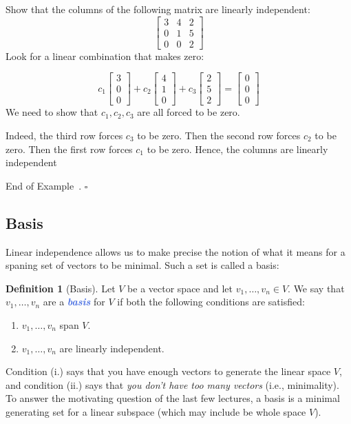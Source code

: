 \documentclass[10pt]{article}
\newcommand{\demph}[1]{\textcolor{RoyalBlue}{\textbf{\slshape #1}}} %
\theoremstyle{definition}
\newtheorem{definition}[theorem]{Definition}
\newtheorem{example}[theorem]{Example}
\renewenvironment{example}
{\begin{oldexample}}
  {\par\smallskip\hfill   End of Example~\theexample. $\square$    \par\end{oldexample}}
\begin{document}
\begin{example}
  Show that the columns of the following matrix are linearly independent:
  \begin{equation*}
    \begin{bmatrix}
      3&4&2\\0&1&5\\0&0&2
    \end{bmatrix}
  \end{equation*}
  Look for a linear combination that makes zero:
  
  \begin{equation*}
    c_{1}
    \begin{bmatrix}
      3\\0\\0
    \end{bmatrix}
    +
    c_{2}
    \begin{bmatrix}
      4\\1\\0
    \end{bmatrix}
    +
    c_{3}
    \begin{bmatrix}
      2\\5\\2
    \end{bmatrix}
    =
    \begin{bmatrix}
      0\\0\\0
    \end{bmatrix}
  \end{equation*}
  We need to show that $c_{1},c_{2},c_{3}$ are all forced to be zero.

  Indeed, the third row forces $c_{3}$ to be zero. Then the second row forces
  $c_{2}$ to be zero. Then the first row forces $c_{1}$ to be zero. Hence, the
  columns are linearly independent
\end{example}




\subsection{Basis}
Linear independence allows us to make precise the notion of what it means for
a spaning set of vectors to be minimal. Such a set is called a basis:

\begin{definition}[Basis]
  \label{def:basis}
  Let $V$ be a vector space and let $v_{1},\ldots,v_{n}\in V$. We say that
  $v_{1},\ldots,v_{n}$ are a \demph{basis} for $V$ if both the following
  conditions are satisfied:
  \begin{enumerate}[label=(\roman*.)]
    \item $v_{1},\ldots,v_{n}$ span $V$. 
    \item $v_{1},\ldots,v_{n}$ are linearly independent. 
  \end{enumerate}
\end{definition}
Condition (i.) says that you have enough vectors to generate the linear space
$V$, and condition (ii.) says that \textit{you don't have too many vectors}
(i.e., minimality). To answer the motivating question of the last few
lectures, a basis is a minimal generating set for a linear subspace (which may
include be whole space $V$).
\end{document}
